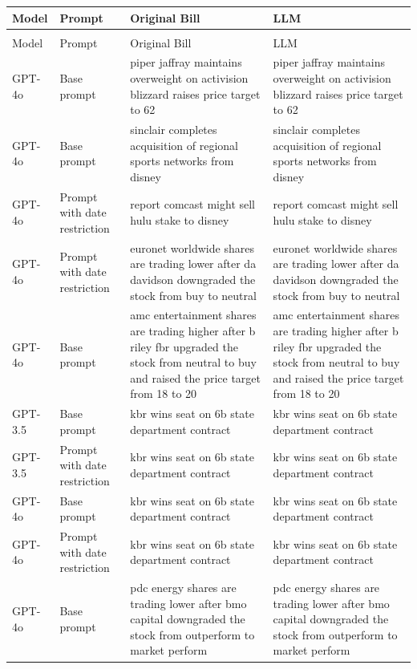 
\begin{longtable}{>{\raggedright\arraybackslash}p{1.4cm}>{\raggedright\arraybackslash}p{1.4cm}>{\raggedright\arraybackslash}p{5.5cm}>{\raggedright\arraybackslash}p{5.5cm}}
\toprule
Model & Prompt & Original Bill & LLM\\
\midrule
\endfirsthead
\multicolumn{4}{@{}l}{\textit{(continued)}}\\
\toprule
Model & Prompt & Original Bill & LLM\\
\midrule
\endhead

\endfoot
\bottomrule
\endlastfoot
GPT-4o & Base prompt & piper jaffray maintains overweight on activision blizzard raises price target to 62 & piper jaffray maintains overweight on activision blizzard raises price target to 62\\
GPT-4o & Base prompt & sinclair completes acquisition of regional sports networks from disney & sinclair completes acquisition of regional sports networks from disney\\
GPT-4o & Prompt with date restriction & report comcast might sell hulu stake to disney & report comcast might sell hulu stake to disney\\
GPT-4o & Prompt with date restriction & euronet worldwide shares are trading lower after da davidson downgraded the stock from buy to neutral & euronet worldwide shares are trading lower after da davidson downgraded the stock from buy to neutral\\
GPT-4o & Base prompt & amc entertainment shares are trading higher after b riley fbr upgraded the stock from neutral to buy and raised the price target from 18 to 20 & amc entertainment shares are trading higher after b riley fbr upgraded the stock from neutral to buy and raised the price target from 18 to 20\\
GPT-3.5 & Base prompt & kbr wins seat on 6b state department contract & kbr wins seat on 6b state department contract\\
GPT-3.5 & Prompt with date restriction & kbr wins seat on 6b state department contract & kbr wins seat on 6b state department contract\\
GPT-4o & Base prompt & kbr wins seat on 6b state department contract & kbr wins seat on 6b state department contract\\
GPT-4o & Prompt with date restriction & kbr wins seat on 6b state department contract & kbr wins seat on 6b state department contract\\
GPT-4o & Base prompt & pdc energy shares are trading lower after bmo capital downgraded the stock from outperform to market perform & pdc energy shares are trading lower after bmo capital downgraded the stock from outperform to market perform\\

\end{longtable}
